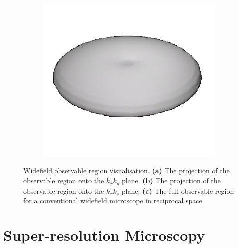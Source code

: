 \begin{figure}[h]
\begin{subfigure}[t]{0.25\textwidth}
		\centering
		\includegraphics[width=\linewidth]{images/3D_SIM_OTF_no_angle.png}
		\caption{}
		\label{fig:WF_OTF}
	\end{subfigure}
	\caption[Widefield observable region visualisation]{Widefield observable 
		region visualisation. \textbf{(a)} The projection of the observable 
		region onto the $k_{x}k_{y}$ plane. \textbf{(b)} The projection of 
		the observable region onto the $k_{x}k_{z}$ plane. \textbf{(c)} The 
		full observable region for a conventional widefield microscope in 
		reciprocal space.}
	\label{fig:widefield_OTF_visualisation}
\end{figure}

\section{Super-resolution Microscopy}
\label{sec:super_res}


